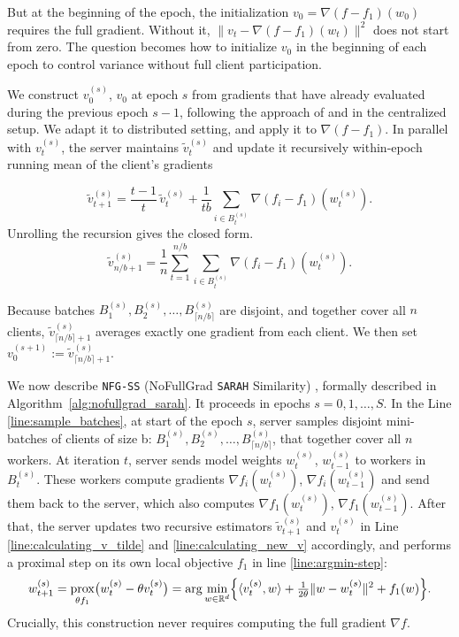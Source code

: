 \documentclass{article}
\DeclareMathOperator{\prox}{prox}
\begin{document}
But at the beginning of the epoch, the initialization $v_0 = \nabla (f-f_1)(w_0)$ requires the full gradient. Without it, $\|v_t - \nabla(f - f_1)(w_t)\|^2$ does not start from zero. The question becomes how to initialize $v_0$ in the beginning of each epoch to control variance without full client participation. 

We construct $v^{(s)}_0$, $v_0$ at epoch $s$ from gradients that have already evaluated during the previous epoch $s-1$, following the approach of \cite{beznosikov2024random} and \cite{medyakov2025variance} in the centralized setup. We adapt it to distributed setting, and apply it to $\nabla (f - f_1)$. In parallel with $v^{(s)}_t$, the server maintains $\tilde v_t^{(s)}$ and update it recursively within-epoch running mean of the client's gradients 

\begin{equation}
\label{eq:bridge_update}
    \tilde v_{t+1}^{(s)} = \frac{t-1}{t}\,\tilde v_t^{(s)} 
    + \frac{1}{tb}\sum_{i \in B_t^{(s)}} \nabla(f_i - f_1)(w_t^{(s)}).
\end{equation}
Unrolling the recursion gives the closed form.
\begin{equation}
\label{eq:bridge_main_update}
    \tilde v_{n/b+1}^{(s)} = \frac{1}{n}\sum_{t=1}^{n/b}\sum_{i \in B_t^{(s)}}
    \nabla(f_i - f_1)(w_t^{(s)}).
\end{equation}


Because batches $B^{(s)}_1, B^{(s)}_2, \ldots, B^{(s)}_{\lceil n/b \rceil}$ are disjoint, and together cover all $n$ clients, $\tilde v^{(s)}_{\lceil n/b \rceil + 1}$ averages exactly one gradient from each client. We then set $v_0^{(s+1)} := \tilde v_{\lceil n/b \rceil + 1}^{(s)}$.

We now describe \texttt{NFG-SS} (NoFullGrad \texttt{SARAH} Similarity) , formally described in Algorithm~\ref{alg:nofullgrad_sarah}. It proceeds in epochs $s=0, 1, \ldots, S$. In the Line \ref{line:sample_batches}, at start of the epoch $s$, server samples disjoint mini-batches of clients of size b: $B^{(s)}_1, B^{(s)}_2, \ldots, B^{(s)}_{\lceil n/b \rceil}$, that together cover all $n$ workers. At iteration $t$, server sends model weights $w^{(s)}_t$, $w^{(s)}_{t-1}$ to workers in $B^{(s)}_t$. These workers compute gradients $\nabla f_i(w^{(s)}_t)$, $\nabla f_i(w^{(s)}_{t-1})$ and send them back to the server, which also computes $\nabla f_1(w^{(s)}_t)$, $\nabla f_1(w^{(s)}_{t-1})$. After that, the server updates two recursive 
estimators $\tilde v_{t+1}^{(s)}$ and $v_t^{(s)}$ in Line \ref{line:calculating_v_tilde} and \ref{line:calculating_new_v} accordingly, and performs a 
proximal step on its own local objective $f_1$ in line \ref{line:argmin-step}:
\begin{equation}
    w_{t+1}^{(s)} = \prox_{\theta f_1}\bigl(w_t^{(s)} - \theta v_t^{(s)}\bigr) 
    = \arg\min_{w \in \mathbb{R}^d} \Bigl\{\langle v_t^{(s)}, w \rangle 
    + \tfrac{1}{2\theta}\|w - w_t^{(s)}\|^2 + f_1(w)\Bigr\}.
\end{equation}
Crucially, this construction never requires 
computing the full gradient $\nabla f$.
\end{document}
